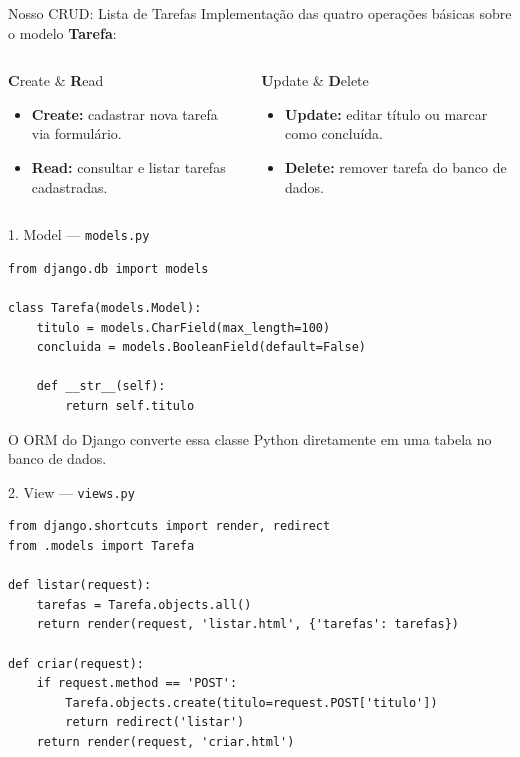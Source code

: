 \documentclass[aspectratio=169, 11pt]{beamer}
\begin{document}
\begin{frame}{Nosso CRUD: Lista de Tarefas}
  Implementação das quatro operações básicas sobre o modelo \textbf{Tarefa}:
  \vspace{0.3cm}

  \begin{columns}[T]
    \begin{block}{\textbf{C}reate \& \textbf{R}ead}
      \begin{itemize}
        \item \textbf{Create:} cadastrar nova tarefa via formulário.
        \item \textbf{Read:} consultar e listar tarefas cadastradas.
      \end{itemize}
    \end{block}

    \begin{block}{\textbf{U}pdate \& \textbf{D}elete}
      \begin{itemize}
        \item \textbf{Update:} editar título ou marcar como concluída.
        \item \textbf{Delete:} remover tarefa do banco de dados.
      \end{itemize}
    \end{block}
  \end{columns}
\end{frame}

\begin{frame}[fragile]{1. Model --- \texttt{models.py}}
\begin{lstlisting}
from django.db import models

class Tarefa(models.Model):
    titulo = models.CharField(max_length=100)
    concluida = models.BooleanField(default=False)

    def __str__(self):
        return self.titulo
\end{lstlisting}
  \vspace{0.2cm}
  \small\color{textMuted} O ORM do Django converte essa classe Python diretamente em uma tabela no banco de dados.
\end{frame}

\begin{frame}[fragile]{2. View --- \texttt{views.py}}
\begin{lstlisting}
from django.shortcuts import render, redirect
from .models import Tarefa

def listar(request):
    tarefas = Tarefa.objects.all()
    return render(request, 'listar.html', {'tarefas': tarefas})

def criar(request):
    if request.method == 'POST':
        Tarefa.objects.create(titulo=request.POST['titulo'])
        return redirect('listar')
    return render(request, 'criar.html')
\end{lstlisting}
\end{frame}
\end{document}
